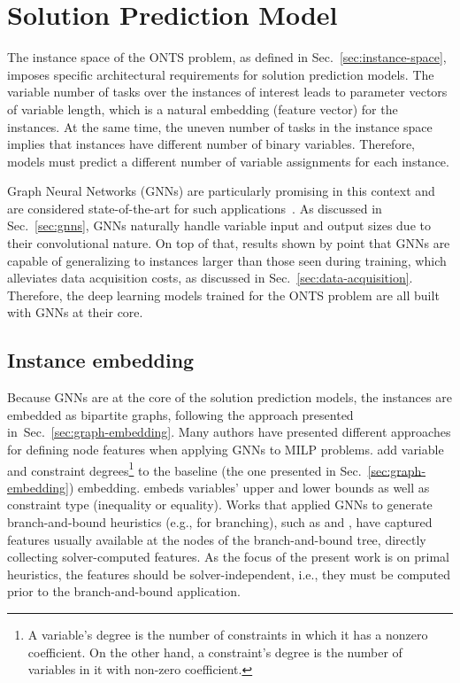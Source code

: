\section{Solution Prediction Model}

The instance space of the ONTS problem, as defined in Sec.~\ref{sec:instance-space}, imposes specific architectural requirements for solution prediction models.
The variable number of tasks over the instances of interest leads to parameter vectors of variable length, which is a natural embedding (feature vector) for the instances.
At the same time, the uneven number of tasks in the instance space implies that instances have different number of binary variables.
Therefore, models must predict a different number of variable assignments for each instance.

Graph Neural Networks (GNNs) are particularly promising in this context and are considered state-of-the-art for such applications~\cite{cappartCombinatorialOptimizationReasoning2022}.
As discussed in Sec.~\ref{sec:gnns}, GNNs naturally handle variable input and output sizes due to their convolutional nature.
On top of that, results shown by  point that GNNs are capable of generalizing to instances larger than those seen during training, which alleviates data acquisition costs, as discussed in Sec.~\ref{sec:data-acquisition}.
Therefore, the deep learning models trained for the ONTS problem are all built with GNNs at their core.

\subsection{Instance embedding}

Because GNNs are at the core of the solution prediction models, the instances are embedded as bipartite graphs, following the approach presented in~Sec.~\ref{sec:graph-embedding}.
Many authors have presented different approaches for defining node features when applying GNNs to MILP problems.
 add variable and constraint degrees\footnote{A variable's degree is the number of constraints in which it has a nonzero coefficient. On the other hand, a constraint's degree is the number of variables in it with non-zero coefficient.} to the baseline (the one presented in Sec.~\ref{sec:graph-embedding}) embedding.
 embeds variables' upper and lower bounds as well as constraint type (inequality or equality).
Works that applied GNNs to generate branch-and-bound heuristics (e.g., for branching), such as  and , have captured features usually available at the nodes of the branch-and-bound tree, directly collecting solver-computed features.
As the focus of the present work is on primal heuristics, the features should be solver-independent, i.e., they must be computed prior to the branch-and-bound application.

